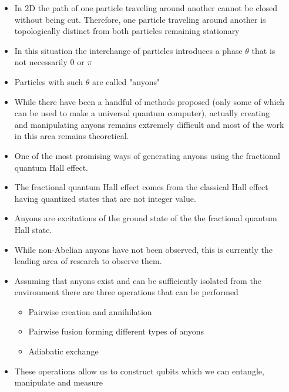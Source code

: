 \documentclass[20pt,,margin=1in,innermargin=-4.5in,blockverticalspace=-0.25in]{tikzposter}
\begin{document}
\begin{columns}
{\begin{tikzfigure}
        \end{tikzfigure}
        \begin{itemize}
            \item In 2D the path of one particle traveling around another cannot be closed without being cut. Therefore, one particle traveling around another is topologically distinct from both particles remaining stationary
             \item In this situation the interchange of particles introduces a phase $\theta$ that is not necessarily $0$ or $\pi$
             \item Particles with such $\theta$ are called "anyons"
             \item While there have been a handful of methods proposed (only some of which can be used to make a universal quantum computer), actually creating and manipulating anyons remains extremely difficult and most of the work in this area remains theoretical.
             \item One of the most promising ways of generating anyons using the fractional quantum Hall effect.
             \item The fractional quantum Hall effect comes from the classical Hall effect having quantized states that are not integer value.
             \item Anyons are excitations of the ground state of the the fractional quantum Hall state.
             \item While non-Abelian anyons have not been observed, this is currently the leading area of research to observe them.
             \item Assuming that anyons exist and can be sufficiently isolated from the environment there are three operations that can be performed \cite{cite:1}
             \begin{itemize}
                 \item Pairwise creation and annihilation
                 \item Pairwise fusion forming different types of anyons
                 \item Adiabatic exchange
             \end{itemize}
             \item These operations allow us to construct qubits which we can entangle, manipulate and measure
         \end{itemize}
    }
   

\end{columns}
\end{document}
